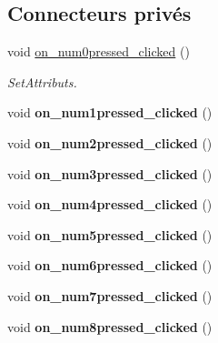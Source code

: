 \subsection*{Connecteurs privés}
\begin{DoxyCompactItemize}
\item 
void \hyperlink{class_main_window_a7e5faa2f00eacc806d42037f2ce17bc2}{on\-\_\-num0pressed\-\_\-clicked} ()
\begin{DoxyCompactList}\small\item\em Set\-Attributs. \end{DoxyCompactList}\item 
\hypertarget{class_main_window_afab80ee873569e7e5e8b605be2d7b019}{void {\bfseries on\-\_\-num1pressed\-\_\-clicked} ()}\label{class_main_window_afab80ee873569e7e5e8b605be2d7b019}

\item 
\hypertarget{class_main_window_ad2b295fc85623be685920ed09c61b0f3}{void {\bfseries on\-\_\-num2pressed\-\_\-clicked} ()}\label{class_main_window_ad2b295fc85623be685920ed09c61b0f3}

\item 
\hypertarget{class_main_window_a329fa5a6416ae31029d4073f559d2889}{void {\bfseries on\-\_\-num3pressed\-\_\-clicked} ()}\label{class_main_window_a329fa5a6416ae31029d4073f559d2889}

\item 
\hypertarget{class_main_window_a5435671eb566422390fae3b2666f8807}{void {\bfseries on\-\_\-num4pressed\-\_\-clicked} ()}\label{class_main_window_a5435671eb566422390fae3b2666f8807}

\item 
\hypertarget{class_main_window_a8c68e194a4c710e10d0fd7e26b0aa8f5}{void {\bfseries on\-\_\-num5pressed\-\_\-clicked} ()}\label{class_main_window_a8c68e194a4c710e10d0fd7e26b0aa8f5}

\item 
\hypertarget{class_main_window_ac60b197b1c2bc04b781816f6a10d5a71}{void {\bfseries on\-\_\-num6pressed\-\_\-clicked} ()}\label{class_main_window_ac60b197b1c2bc04b781816f6a10d5a71}

\item 
\hypertarget{class_main_window_adde2c5bca4be162576fd92330f6a864b}{void {\bfseries on\-\_\-num7pressed\-\_\-clicked} ()}\label{class_main_window_adde2c5bca4be162576fd92330f6a864b}

\item 
\hypertarget{class_main_window_a92fa92d2d569c456d13c519df78d15c5}{void {\bfseries on\-\_\-num8pressed\-\_\-clicked} ()}\label{class_main_window_a92fa92d2d569c456d13c519df78d15c5}


\end{DoxyCompactItemize}
